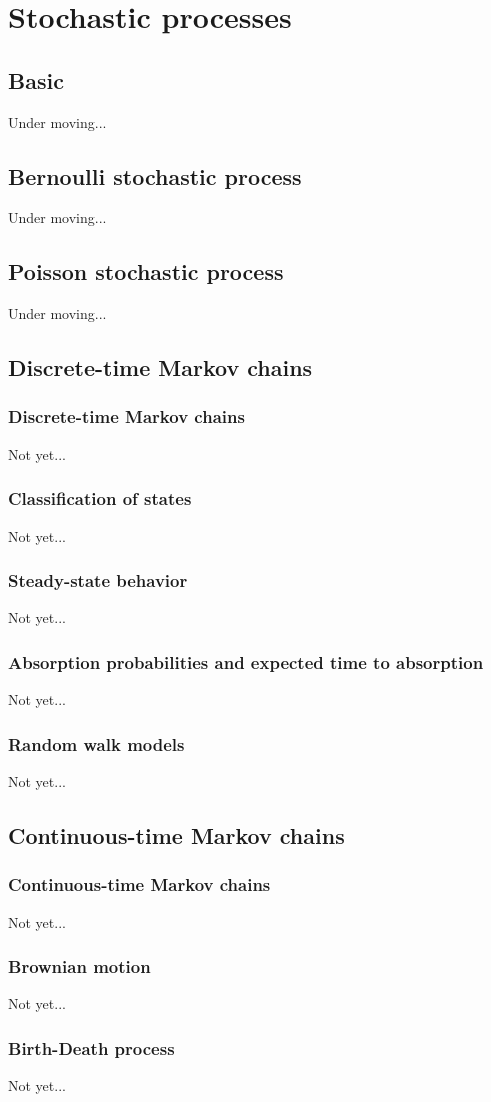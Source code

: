 \section{Stochastic processes}
\subsection{Basic}
Under moving...


\subsection{Bernoulli stochastic process}
Under moving...


\subsection{Poisson stochastic process}
Under moving...


\subsection{Discrete-time Markov chains}
\subsubsection{Discrete-time Markov chains}
Not yet...


\subsubsection{Classification of states}
Not yet...


\subsubsection{Steady-state behavior}
Not yet...


\subsubsection{Absorption probabilities and expected time to absorption}
Not yet...


\subsubsection{Random walk models}
Not yet...



\subsection{Continuous-time Markov chains}
\subsubsection{Continuous-time Markov chains}
Not yet...


\subsubsection{Brownian motion}
Not yet...


\subsubsection{Birth-Death process}
Not yet...

